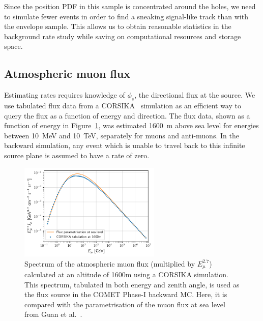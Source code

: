 Since the position PDF in this sample is concentrated around the holes, we need
to simulate fewer events in order to find a sneaking signal-like track than with
the envelope sample. This allows us to obtain reasonable statistics in the
background rate study while saving on computational resources and storage space.



\subsection{Atmospheric muon flux}
Estimating rates requires knowledge of $\phi_s$, the directional flux at the
source. We use tabulated flux data from a CORSIKA~\cite{corsika} simulation as
an efficient way to query the flux as a function of energy and direction. The
flux data, shown as a function of energy in
Figure~\ref{fig:corsika_flux_distribution}, was estimated \SI{1600}{\metre}
above sea level for energies between \SI{10}{\MeV} and \SI{10}{\TeV}, separately
for muons and anti-muons. In the backward simulation, any event which is unable to
travel back to this infinite source plane is assumed to have a rate of zero.

\begin{figure}
    \centering
    \includegraphics[width=0.6\textwidth]{chapter5/flux_distribution.pdf}
    \caption{ Spectrum of the atmospheric muon flux (multiplied by
        $E_\mu^{2.7}$) calculated at an altitude of 1600m using a CORSIKA
        simulation. This spectrum, tabulated in both energy and zenith angle, is
        used as the flux source in the COMET Phase-I backward MC. Here, it is
        compared with the parametrisation of the muon flux at sea level from Guan
        et al.~\cite{gccly}. }
    \label{fig:corsika_flux_distribution}
\end{figure}


